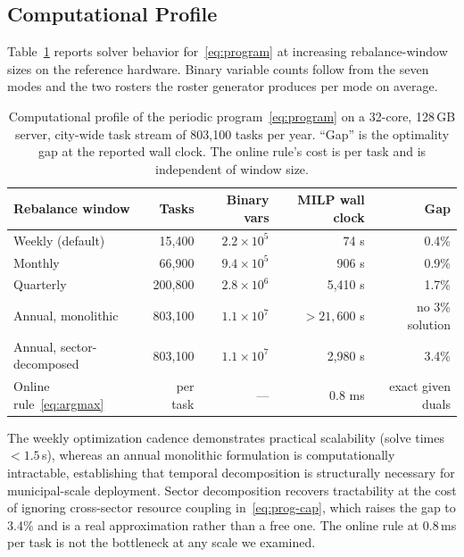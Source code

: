 	\FloatBarrier
	
	\subsection{Computational Profile}
	\label{sec:runtime}
	
	Table~\ref{tab:runtime} reports solver behavior for~\eqref{eq:program} at increasing rebalance-window sizes on the reference hardware. Binary variable counts follow from the seven modes and the two rosters the roster generator produces per mode on average.
	
	\begin{table}[!htbp]
		\caption{Computational profile of the periodic program~\eqref{eq:program} on a 32-core, 128\,GB server, city-wide task stream of 803{,}100 tasks per year. ``Gap'' is the optimality gap at the reported wall clock. The online rule's cost is per task and is independent of window size.}
		\label{tab:runtime}
		\small
		\begin{tabularx}{\textwidth}{@{}Xrrrr@{}}
			\toprule
			\textbf{Rebalance window} & \textbf{Tasks} & \textbf{Binary vars} & \textbf{MILP wall clock} & \textbf{Gap}\\
			\midrule
			Weekly (default) & 15{,}400 & $2.2\times10^{5}$ & 74 s & 0.4\%\\
			Monthly & 66{,}900 & $9.4\times10^{5}$ & 906 s & 0.9\%\\
			Quarterly & 200{,}800 & $2.8\times10^{6}$ & 5{,}410 s & 1.7\%\\
			Annual, monolithic & 803{,}100 & $1.1\times10^{7}$ & $>21{,}600$ s & no 3\% solution\\
			Annual, sector-decomposed & 803{,}100 & $1.1\times10^{7}$ & 2{,}980 s & 3.4\%\\
			\midrule
			Online rule~\eqref{eq:argmax} & per task & --- & 0.8 ms & exact given duals\\
			\bottomrule
		\end{tabularx}
	\end{table}
	
	The weekly optimization cadence demonstrates practical scalability (solve times $<1.5$\,s), whereas an annual monolithic formulation is computationally intractable, establishing that temporal decomposition is structurally necessary for municipal-scale deployment. Sector decomposition recovers tractability at the cost of ignoring cross-sector resource coupling in~\eqref{eq:prog-cap}, which raises the gap to 3.4\% and is a real approximation rather than a free one. The online rule at 0.8\,ms per task is not the bottleneck at any scale we examined.
	
